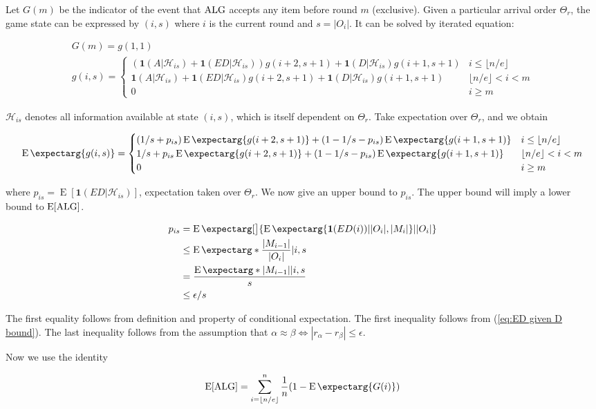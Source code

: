 \documentclass{article}
\newcommand{\expec}{\operatorname{E}}
\newcommand{\card}[1]{\lvert #1 \rvert}
\newcommand{\expect}{\operatorname{E}\expectarg}
\begin{document}
Let $G(m)$ be the indicator of the event that $\text{ALG}$ accepts any item before round $m$ (exclusive). Given a particular arrival order $\Theta_r$, the game state can be expressed by $(i,s)$ where $i$ is the current round and $s = |O_i|$. It can be solved by iterated equation:

\begin{gather*}
G(m) = g(1, 1)\\
g(i,s) = \begin{cases}
(\mathbf{1}(A|\mathcal{H}_{is}) + 
\mathbf{1}(ED|\mathcal{H}_{is}))g(i+2, s+1) + 
\mathbf{1}(D|\mathcal{H}_{is})g(i+1,s+1) & i\leq\lfloor n/e \rfloor\\
\mathbf{1}(A|\mathcal{H}_{is}) + 
\mathbf{1}(ED|\mathcal{H}_{is})g(i+2, s+1) + 
\mathbf{1}(D|\mathcal{H}_{is})g(i+1,s+1) & \lfloor n/e \rfloor<i<m\\
0 & i \geq m
\end{cases}
\end{gather*}

$\mathcal{H}_{is}$ denotes all information available at state $(i,s)$, which is itself dependent on $\Theta_r$.
Take expectation over $\Theta_r$, and we obtain

\begin{equation*}
\expect{g(i,s)} = \begin{cases}
(1/s + 
p_{is})\expect{g(i+2, s+1)} + 
(1-1/s-p_{is})\expect{g(i+1,s+1)} & i\leq\lfloor n/e \rfloor\\

1/s + 
p_{is}\expect{g(i+2, s+1)} + 
(1-1/s-p_{is})\expect{g(i+1,s+1)} & \lfloor n/e \rfloor<i<m\\

0 & i \geq m
\end{cases}
\end{equation*}

where $p_{is} = \expec[\mathbf{1}(ED|\mathcal{H}_{is})]$, expectation taken over $\Theta_r$. We now give an upper bound to $p_{is}$. The upper bound will imply a lower bound to $\expec[\ALG]$.

\begin{align*}
p_{is} &= \expect[\big]{\expect{\mathbf{1}(ED(i)) |  \card{O_i}, \card{M_i}} | \card{O_i}}
\\&\leq \expect*{\frac{\card{M_{i-1}}}{\card{O_{i}} }| i,s}
\\&= \frac{\expect*{\card{M_{i-1}}|i,s}}{s}
\\&\leq \epsilon/s
\end{align*}

The first equality follows from definition and property of conditional expectation. The first inequality follows from (\ref{eq:ED given D bound}).  The last inequality follows from the assumption that $\alpha \approx \beta \iff |r_\alpha - r_\beta|\leq \epsilon$.

Now we use the identity

\begin{equation*}
\expec[\ALG] = \sum_{i=\lfloor n/e \rfloor}^n \frac{1}{n} (1-\expect{G(i)}) 
\end{equation*}
\end{document}
